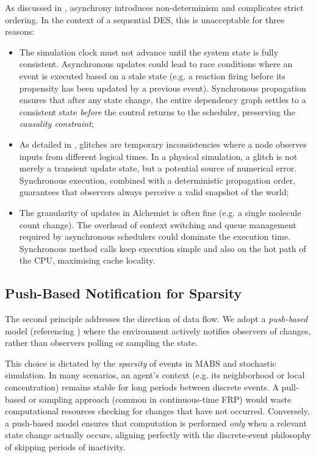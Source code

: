 As discussed in , asynchrony introduces non-determinism
and complicates strict ordering. In the context of a sequential \ac{DES}, this
is unacceptable for three reasons:
\begin{itemize}
	\item The simulation clock must not advance until the system state is
	      fully consistent. Asynchronous updates could lead to race
	      conditions where an event is executed based on a stale state
	      (e.g. a reaction firing before its propensity has been updated
	      by a previous event). Synchronous propagation ensures that
	      after any state change, the entire dependency graph settles to
	      a consistent state \emph{before} the control returns to the
	      scheduler, preserving the \emph{causality constraint};
	\item As detailed in , glitches
	      are temporary inconsistencies where a node observes inputs from
	      different logical times. In a physical simulation, a glitch is not
	      merely a transient update state, but a potential source of
	      numerical error. Synchronous execution, combined with a
	      deterministic propagation order, guarantees that observers always
	      perceive a valid snapshot of the world;
	\item The granularity of updates in Alchemist is often fine (e.g. a
	      single molecule count change). The overhead of context
	      switching and queue management required by asynchronous
	      schedulers could dominate the execution time. Synchronous
	      method calls keep execution simple and also on the hot path of
	      the CPU, maximising cache locality.
\end{itemize}

\subsection{Push-Based Notification for Sparsity}
The second principle addresses the direction of data flow. We adopt a
\emph{push-based} model (referencing ) where the
environment actively notifies observers of changes, rather than observers
polling or sampling the state.

This choice is dictated by the \emph{sparsity} of events in \ac{MABS} and
stochastic simulation. In many scenarios, an agent's context (e.g. its
neighborhood or local concentration) remains stable for long periods between
discrete events. A pull-based or sampling approach (common in continuous-time
FRP) would waste computational resources checking for changes that have not
occurred. Conversely, a push-based model ensures that computation is performed
\emph{only} when a relevant state change actually occurs, aligning perfectly
with the discrete-event philosophy of skipping periods of inactivity.

